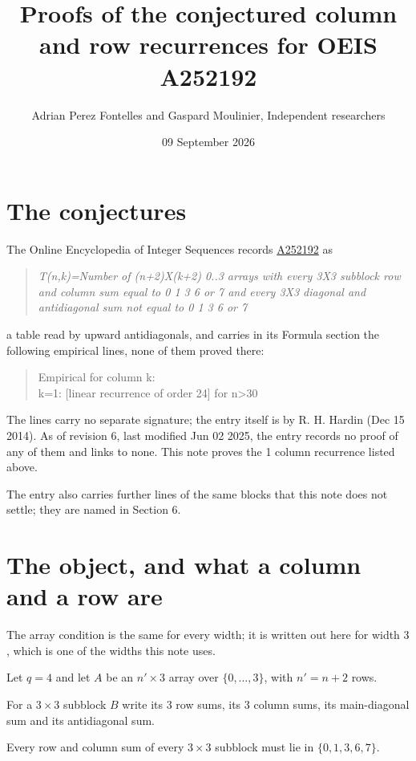 \documentclass[11pt]{article}
\title{Proofs of the conjectured column and row recurrences for OEIS A252192}
\author{Adrian Perez Fontelles and Gaspard Moulinier, Independent researchers}
\date{09 September 2026}
\theoremstyle{definition}
\begin{document}
\maketitle
\section{The conjectures}

The Online Encyclopedia of Integer Sequences records \href{https://oeis.org/A252192}{A252192} as

\begin{quote}\itshape T(n,k)=Number of (n+2)X(k+2) 0..3 arrays with every 3X3 subblock row and column sum equal to 0 1 3 6 or 7 and every 3X3 diagonal and antidiagonal sum not equal to 0 1 3 6 or 7\end{quote}

a table read by upward antidiagonals, and carries in its Formula section the following empirical lines, none of them proved there:

\begin{quote}\ttfamily Empirical for column k:\\
k=1: [linear recurrence of order 24] for n>30\end{quote}

The lines carry no separate signature; the entry itself is by R. H. Hardin (Dec 15 2014). As of revision 6, last modified Jun 02 2025, the entry records no proof of any of them and links to none. This note proves the 1 column recurrence listed above.

The entry also carries further lines of the same blocks that this note does not settle; they are named in Section 6.

\section{The object, and what a column and a row are}

The array condition is the same for every width; it is written out here for width $3$, which is one of the widths this note uses.

Let $q = 4$ and let $A$ be an $n' \times 3$ array over $\{0,\dots,3\}$, with $n' = n + 2$ rows.

For a $3\times3$ subblock $B$ write its 3 row sums, its 3 column sums, its main-diagonal sum and its antidiagonal sum.

Every row and column sum of every $3\times3$ subblock must lie in $\{0, 1, 3, 6, 7\}$.
\end{document}
